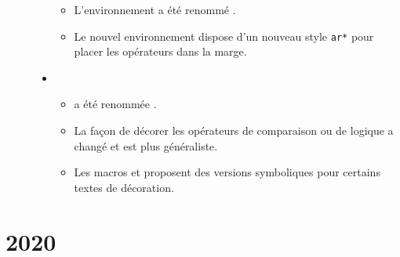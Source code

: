 \documentclass[12pt,a4paper]{book}
\begin{document}
\begin{description}
\begin{itemize}[itemsep=.5em]
\begin{itemize}[itemsep=.5em]
        \item L'environnement  a été renommé .

        \item Le nouvel environnement  dispose d'un nouveau style \verb#ar*# pour placer les opérateurs dans la marge.
    \end{itemize}


    \item {}
    \begin{itemize}[itemsep=.5em]
        \item {} a été renommée .

        \item La façon de décorer les opérateurs de comparaison ou de logique a changé et est plus généraliste.

        \item Les macros  et  proposent des versions symboliques pour certains textes de décoration.
    \end{itemize}
\end{itemize}


\separation

\end{description}



\section{2020}
\end{document}
